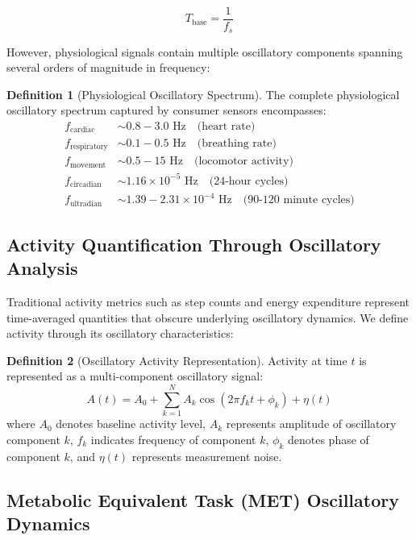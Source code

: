 \documentclass[12pt,a4paper]{article}
\theoremstyle{definition}
\newtheorem{definition}{Definition}[section]
\begin{document}
\begin{equation}
T_{\text{base}} = \frac{1}{f_s}
\end{equation}

However, physiological signals contain multiple oscillatory components spanning several orders of magnitude in frequency:

\begin{definition}[Physiological Oscillatory Spectrum]
The complete physiological oscillatory spectrum captured by consumer sensors encompasses:
\begin{align}
f_{\text{cardiac}} &\sim 0.8-3.0 \text{ Hz} \quad \text{(heart rate)} \\
f_{\text{respiratory}} &\sim 0.1-0.5 \text{ Hz} \quad \text{(breathing rate)} \\
f_{\text{movement}} &\sim 0.5-15 \text{ Hz} \quad \text{(locomotor activity)} \\
f_{\text{circadian}} &\sim 1.16 \times 10^{-5} \text{ Hz} \quad \text{(24-hour cycles)} \\
f_{\text{ultradian}} &\sim 1.39-2.31 \times 10^{-4} \text{ Hz} \quad \text{(90-120 minute cycles)}
\end{align}
\end{definition}

\subsection{Activity Quantification Through Oscillatory Analysis}

Traditional activity metrics such as step counts and energy expenditure represent time-averaged quantities that obscure underlying oscillatory dynamics. We define activity through its oscillatory characteristics:

\begin{definition}[Oscillatory Activity Representation]
Activity at time $t$ is represented as a multi-component oscillatory signal:
\begin{equation}
A(t) = A_0 + \sum_{k=1}^{N} A_k \cos(2\pi f_k t + \phi_k) + \eta(t)
\end{equation}
where $A_0$ denotes baseline activity level, $A_k$ represents amplitude of oscillatory component $k$, $f_k$ indicates frequency of component $k$, $\phi_k$ denotes phase of component $k$, and $\eta(t)$ represents measurement noise.
\end{definition}

\subsection{Metabolic Equivalent Task (MET) Oscillatory Dynamics}
\end{document}
